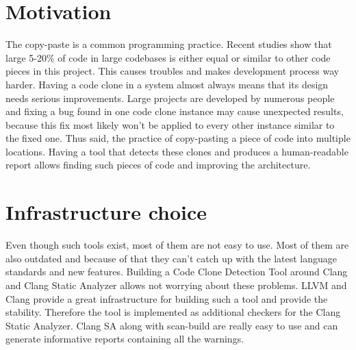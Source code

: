 \documentclass[a0,portrait]{a0poster}
\begin{document}

\begin{multicols}{2}

\color{Black} %


\section*{Motivation}

The copy-paste is a common programming practice. Recent studies show that large 5-20\% of 
code in large codebases is either equal or similar to other code pieces in this project. 
This causes troubles and makes development process way harder. Having a code clone in a 
system almost always means that its design needs serious improvements. Large projects are
developed by numerous people and fixing a bug found in one code clone instance may cause
unexpected results, because this fix most likely won't be applied to every other 
instance similar to the fixed one. Thus said, the practice of copy-pasting a piece of
code into multiple locations. Having a tool that detects these clones and produces a
human-readable report allows finding such pieces of code and improving the architecture.


\section*{Infrastructure choice}

Even though such tools exist, most of them are not easy to use. Most of them are also
outdated and because of that they can't catch up with the latest language standards and
new features. Building a Code Clone Detection Tool around Clang and Clang Static Analyzer
allows not worrying about these problems. LLVM and Clang provide a great infrastructure
for building such a tool and provide the stability. Therefore the tool is implemented
as additional checkers for the Clang Static Analyzer. Clang SA along with scan-build
are really easy to use and can generate informative reports containing all the warnings.


\end{multicols}
\end{document}
